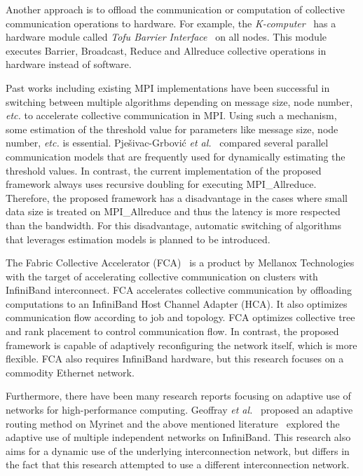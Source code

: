 Another approach is to offload the communication or computation of collective
communication operations to hardware. For example, the
\emph{K-computer}~\autocite{Yokokawa2011} has a hardware module called
\emph{Tofu Barrier Interface}~\autocite{Ajima2012} on all nodes. This module
executes Barrier, Broadcast, Reduce and Allreduce collective operations in
hardware instead of software.

Past works including existing MPI implementations have been successful in
switching between multiple algorithms depending on message size, node number,
\emph{etc.} to accelerate collective communication in MPI\@. Using such a
mechanism, some estimation of the threshold value for parameters like message
size, node number, \emph{etc.} is essential. Pje\v{s}ivac-Grbovi\'{c} \emph{et
al.}~\autocite{PjesivacGrbovic2007} compared several parallel communication
models that are frequently used for dynamically estimating the threshold
values. In contrast, the current implementation of the proposed framework
always uses recursive doubling for executing MPI\_Allreduce. Therefore, the
proposed framework has a disadvantage in the cases where small data size is
treated on MPI\_Allreduce and thus the latency is more respected than the
bandwidth. For this disadvantage, automatic switching of algorithms that
leverages estimation models is planned to be introduced.

The Fabric Collective Accelerator (FCA)~\autocite{fca} is a product by
Mellanox Technologies with the target of accelerating collective
communication on clusters with InfiniBand interconnect. FCA accelerates
collective communication by offloading computations to an InfiniBand
Host Channel Adapter (HCA). It also optimizes communication flow
according to job and topology. FCA optimizes collective tree and rank
placement to control communication flow. In contrast, the proposed
framework is capable of adaptively reconfiguring the network itself,
which is more flexible. FCA also requires InfiniBand hardware, but this
research focuses on a commodity Ethernet network.

Furthermore, there have been many research reports focusing on adaptive
use of networks for high-performance computing. Geoffray \emph{et
al.}~\autocite{Geoffray2008} proposed an adaptive routing method on Myrinet
and the above mentioned literature~\autocite{Jiuxing2004} explored the
adaptive use of multiple independent networks on InfiniBand. This research also
aims for a dynamic use of the underlying interconnection network, but differs
in the fact that this research attempted to use a different interconnection
network.

